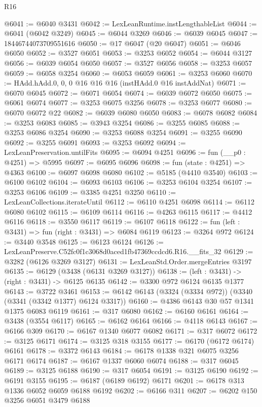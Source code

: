 \begin{lexlean}{R16}
\begin{coremodule}
@6041 := @6040 @3431
@6042 := LexLeanRuntime.instLengthableList
@6044 := @6041 (@6042 @3249)
@6045 := @6044 @3269
@6046 := @6039 @6045
@6047 := 18446744073709551616
@6050 := @17 @6047 (@20 @6047)
@6051 := @6046 @6050
@6052 := @3527 @6051
@6053 := @3253 @6052
@6054 := @6044 @3127
@6056 := @6039 @6054 @6050
@6057 := @3527 @6056
@6058 := @3253 @6057
@6059 := @6058 @3254
@6060 := @6053 @6059
@6061 := @3253 @6060
@6070 := HAdd.hAdd.{0, 0, 0} @16 @16 @16 (instHAdd.{0} @16 instAddNat)
@6071 := @6070 @6045
@6072 := @6071 @6054
@6074 := @6039 @6072 @6050
@6075 := @6061 @6074
@6077 := @3253 @6075 @3256
@6078 := @3253 @6077
@6080 := @6070 @6072 @22
@6082 := @6039 @6080 @6050
@6083 := @6078 @6082
@6084 := @3253 @6083
@6085 := @3943 @3254
@6086 := @3255 @6085
@6088 := @3253 @6086 @3254
@6090 := @3253 @6088 @3254
@6091 := @3255 @6090
@6092 := @3255 @6091
@6093 := @3253 @6092
@6094 := LexLeanPreservation.untilFits
@6095 := @6094 @4251
@6096 := fun (__p0 : @4251) => @5995
@6097 := @6095 @6096
@6098 := fun (state : @4251) => @4363
@6100 := @6097 @6098 @6080
@6102 := @5185 (@4410 @3540)
@6103 := @6100 @6102
@6104 := @6093 @6103
@6106 := @3253 @6104 @3254
@6107 := @3253 @6106
@6109 := @3385 @4251 @3250
@6110 := LexLeanCollections.iterateUntil
@6112 := @6110 @4251 @6098
@6114 := @6112 @6080 @6102
@6115 := @6109 @6114
@6116 := @4263 @6115
@6117 := @4412 @6116
@6118 := @3550 @6117
@6119 := @6107 @6118
@6122 := fun (left : @3431) => fun (right : @3431) => @6084 @6119
@6123 := @3264 @972
@6124 := @3440 @3548
@6125 := @6123 @6124
@6126 := LexLeanPreserve.C52fc0f1c3068d0aced1fb47369ccdcd6.R16.__fits_32
@6129 := @3282 (@6126 @3269 @3127)
@6131 := LexLeanStd.Order.mergeEntries @3197
@6135 := @6129 (@3438 (@6131 @3269 @3127))
@6138 := (left : @3431) -> (right : @3431) -> @6125 @6135
@6142 := @3300 @972 @6124 @6135 @1377
@6143 := @3722 @3461
@6153 := @6142 @6143 (@3324 (@3334 @972)) (@3340 (@3341 (@3342 @1377) @6124 @3317))
@6160 := @4386 @6143 @30 @57 @1341 @1375 @6083 @6119
@6161 := @317 @6080
@6162 := @6160 @6161
@6164 := @3438 (@3554 @6117)
@6165 := @6162 @6164
@6166 := @4118 @6143
@6167 := @6166 @309
@6170 := @6167 @1340 @6077 @6082
@6171 := @317 @6072
@6172 := @3125 @6171
@6174 := @3125 @318 @3155
@6177 := @6170 (@6172 @6174) @6161
@6178 := @3372 @6143
@6184 := @6178 @1338 @321 @6075 @3256 @6171 @6174
@6187 := @6167 @1337 @6060 @6074
@6188 := @317 @6045
@6189 := @3125 @6188
@6190 := @317 @6054
@6191 := @3125 @6190
@6192 := @6191 @3155
@6195 := @6187 (@6189 @6192) @6171
@6201 := @6178 @313 @1336 @6052 @6059 @6188 @6192
@6202 := @6166 @311
@6207 := @6202 @150 @3256 @6051 @3479 @6188

\end{coremodule}
\end{lexlean}
